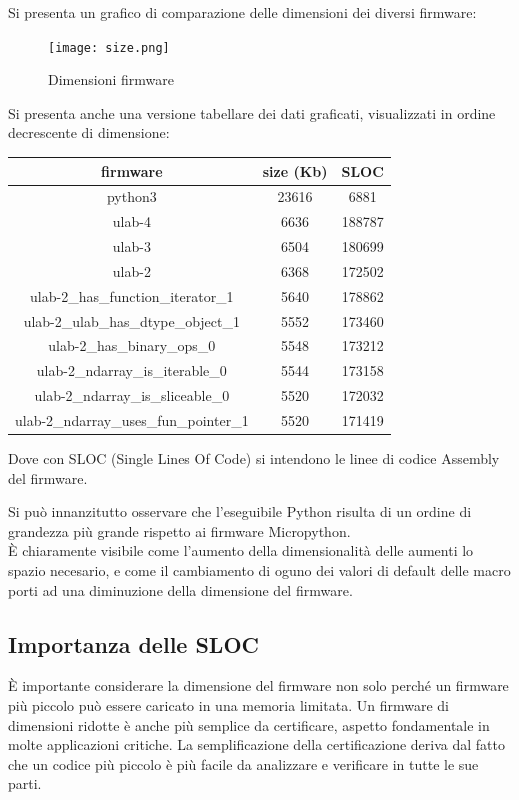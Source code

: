 \documentclass[12pt,a4paper]{report}
\begin{document}
Si presenta un grafico di comparazione delle dimensioni dei diversi firmware:
\begin{figure}
    \centering
    \texttt{[image: size.png]}
    \caption{Dimensioni firmware}
\end{figure}
Si presenta anche una versione tabellare dei dati graficati,
visualizzati in ordine decrescente di dimensione:

\begin{center}
\begin{tabular}{|c | c | c |}
\hline
firmware & size (Kb) & SLOC \\
\hline
python3 & 23616 & 6881 \\
ulab-4 & 6636 & 188787 \\
ulab-3 & 6504 & 180699 \\
ulab-2 & 6368 & 172502 \\
ulab-2\_has\_function\_iterator\_1 & 5640 & 178862 \\
ulab-2\_ulab\_has\_dtype\_object\_1 & 5552 & 173460 \\
ulab-2\_has\_binary\_ops\_0 & 5548 & 173212 \\
ulab-2\_ndarray\_is\_iterable\_0 & 5544 & 173158 \\
ulab-2\_ndarray\_is\_sliceable\_0 & 5520 & 172032 \\
ulab-2\_ndarray\_uses\_fun\_pointer\_1 & 5520 & 171419 \\
\hline
\end{tabular}
\end{center}

Dove con SLOC (Single Lines Of Code) si intendono le linee di codice Assembly del firmware.

Si può innanzitutto osservare che l'eseguibile Python
risulta di un ordine di grandezza più grande rispetto ai firmware
Micropython.\\
È chiaramente visibile come l'aumento della
dimensionalità delle aumenti lo spazio necesario, e come il cambiamento di
oguno dei valori di default delle macro porti ad una diminuzione della dimensione del firmware.

\subsection{Importanza delle SLOC}

È importante considerare la dimensione del firmware non solo perché un firmware più piccolo può essere caricato in una memoria limitata. Un firmware di dimensioni ridotte è anche più semplice da certificare, aspetto fondamentale in molte applicazioni critiche. La semplificazione della certificazione deriva dal fatto che un codice più piccolo è più facile da analizzare e verificare in tutte le sue parti.
\end{document}
